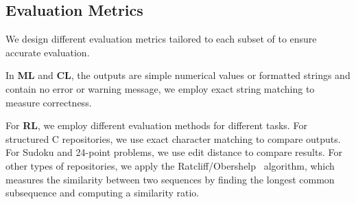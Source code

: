 \begin{table*}[!ht]
\centering
\caption{Statistics of \bench, including construction methods of 8 subsets, problem sources, quantities in our dataset, number of examples in few-shot scenarios, evaluation metrics, and criteria for further classification of these subsets. In the table, ``custom" refers to customized approaches, and ``mixed" indicates multiple methods, which are elaborated in detail in the text.}
\label{tab:1}
\end{table*}

\subsection{Evaluation Metrics}

We design different evaluation metrics tailored to each subset of \bench to ensure accurate evaluation. 

In \textbf{ML} and \textbf{CL}, the outputs are simple numerical values or formatted strings and contain no error or warning message, we employ exact string matching to measure correctness.

For \textbf{RL}, we employ different evaluation methods for different tasks. For structured C repositories, we use exact character matching to compare outputs. For Sudoku and 24-point problems, we use edit distance to compare results. For other types of repositories, we apply the Ratcliff/Obershelp~\citep{ratcliff1988pattern} algorithm, which measures the similarity between two sequences by finding the longest common subsequence and computing a similarity ratio.

